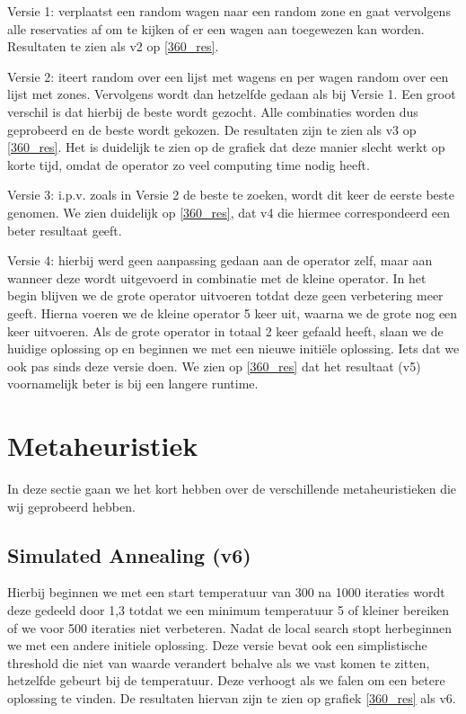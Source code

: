 \documentclass[a4paper, 11pt, one column]{article}
\begin{document}
Versie 1: verplaatst een random wagen naar een random zone en gaat vervolgens alle reservaties af om te kijken of er een wagen aan toegewezen kan worden. Resultaten te zien als v2 op \ref{360_res}.

Versie 2: iteert random over een lijst met wagens en per wagen random over een lijst met zones. Vervolgens wordt dan hetzelfde gedaan als bij Versie 1. Een groot verschil is dat hierbij de beste wordt gezocht. Alle combinaties worden dus geprobeerd en de beste wordt gekozen. De resultaten zijn te zien als v3 op \ref{360_res}. Het is duidelijk te zien op de grafiek dat deze manier slecht werkt op korte tijd, omdat de operator zo veel computing time nodig heeft.

Versie 3: i.p.v. zoals in Versie 2 de beste te zoeken, wordt dit keer de eerste beste genomen. We zien duidelijk op \ref{360_res}, dat v4 die hiermee correspondeerd een beter resultaat geeft.

Versie 4: hierbij werd geen aanpassing gedaan aan de operator zelf, maar aan wanneer deze wordt uitgevoerd in combinatie met de kleine operator. In het begin blijven we de grote operator uitvoeren totdat deze geen verbetering meer geeft. Hierna voeren we de kleine operator 5 keer uit, waarna we de grote nog een keer uitvoeren. Als de grote operator in totaal 2 keer gefaald heeft, slaan we de huidige oplossing op en beginnen we met een nieuwe initiële oplossing. Iets dat we ook pas sinds deze versie doen. We zien op \ref{360_res} dat het resultaat (v5) voornamelijk beter is bij een langere runtime.

\section{Metaheuristiek}
In deze sectie gaan we het kort hebben over de verschillende metaheuristieken die wij geprobeerd hebben.
\subsection{Simulated Annealing (v6)}

Hierbij beginnen we met een start temperatuur van 300 na 1000 iteraties wordt deze gedeeld door 1,3 totdat we een minimum temperatuur 5 of kleiner bereiken of we voor 500 iteraties niet verbeteren.
Nadat de local search stopt herbeginnen we met een andere initiele oplossing. Deze versie bevat ook een simplistische threshold die niet van waarde verandert behalve als we vast komen te zitten,
hetzelfde gebeurt bij de temperatuur. Deze verhoogt als we falen om een betere oplossing te vinden. De resultaten hiervan zijn te zien op grafiek \ref{360_res} als v6.
\end{document}
